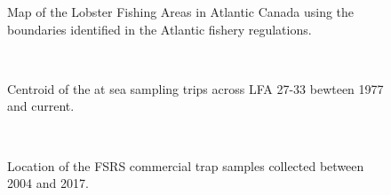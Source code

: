 \documentclass[11pt]{article}
\newcommand{\e}{/backup/bio_data/bio.lobster/figures/} %
\begin{document}
\begin{landscape}
\begin{figure}
\centering
    \caption{Map of the Lobster Fishing Areas in Atlantic Canada using the boundaries identified in the Atlantic fishery regulations.}

\end{figure}
\end{landscape}

\begin{figure}
        \centering
         \\
                     \caption{Centroid of the at sea sampling trips across LFA 27-33 bewteen 1977 and current.}
        \end{figure}



\begin{figure}
        \centering
         \\
                     \caption{Location of the FSRS commercial trap samples collected between 2004 and 2017.}
        \end{figure}
\end{document}
